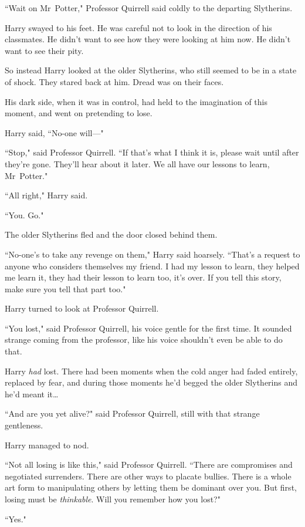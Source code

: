``Wait on Mr~Potter," Professor Quirrell said coldly to the departing Slytherins.

Harry swayed to his feet. He was careful not to look in the direction of his classmates. He didn't want to see how they were looking at him now. He didn't want to see their pity.

So instead Harry looked at the older Slytherins, who still seemed to be in a state of shock. They stared back at him. Dread was on their faces.

His dark side, when it was in control, had held to the imagination of this moment, and went on pretending to lose.

Harry said, ``No-one will—"

``Stop," said Professor Quirrell. ``If that's what I think it is, please wait until after they're gone. They'll hear about it later. We all have our lessons to learn, Mr~Potter."

``All right," Harry said.

``You. Go."

The older Slytherins fled and the door closed behind them.

``No-one's to take any revenge on them," Harry said hoarsely. ``That's a request to anyone who considers themselves my friend. I had my lesson to learn, they helped me learn it, they had their lesson to learn too, it's over. If you tell this story, make sure you tell that part too."

Harry turned to look at Professor Quirrell.

``You lost," said Professor Quirrell, his voice gentle for the first time. It sounded strange coming from the professor, like his voice shouldn't even be able to do that.

Harry \emph{had} lost. There had been moments when the cold anger had faded entirely, replaced by fear, and during those moments he'd begged the older Slytherins and he'd meant it{\ldots}

``And are you yet alive?" said Professor Quirrell, still with that strange gentleness.

Harry managed to nod.

``Not all losing is like this," said Professor Quirrell. ``There are compromises and negotiated surrenders. There are other ways to placate bullies. There is a whole art form to manipulating others by letting them be dominant over you. But first, losing must be \emph{thinkable}. Will you remember how you lost?"

``Yes."

